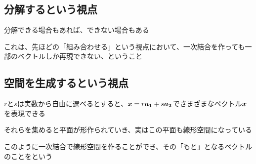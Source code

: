 \documentclass[../book_half_step_linear]{subfiles}
\begin{document}
\sectionline
\subsection{分解するという視点}

分解できる場合もあれば、できない場合もある

これは、先ほどの「組み合わせる」という視点において、一次結合を作っても一部のベクトルしか再現できない、ということ

\sectionline
\subsection{空間を生成するという視点}

$r$と$s$は実数から自由に選べるとすると、$\vb*{x}=r\vb*{a_1}+s\vb*{a_2}$でさまざまなベクトル$\vb*{x}$を表現できる

それらを集めると平面が形作られていき、実はこの平面も線形空間になっている

このように一次結合で線形空間を作ることができ、その「もと」となるベクトルのことをという
\end{document}

